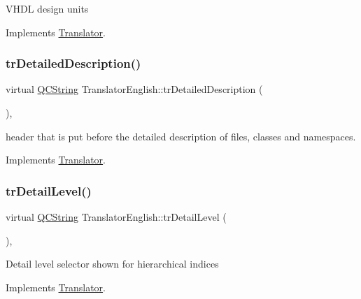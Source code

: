 V\+H\+DL design units 

Implements \mbox{\hyperlink{class_translator}{Translator}}.

\mbox{\label{class_translator_english_a8dd700811e7fe4caa458945578328044}} 
\subsubsection{\texorpdfstring{trDetailedDescription()}{trDetailedDescription()}}
{\footnotesize\ttfamily virtual \mbox{\hyperlink{class_q_c_string}{Q\+C\+String}} Translator\+English\+::tr\+Detailed\+Description (\begin{DoxyParamCaption}{ }\end{DoxyParamCaption})\hspace{0.3cm}{\ttfamily [inline]}, {\ttfamily [virtual]}}

header that is put before the detailed description of files, classes and namespaces. 

Implements \mbox{\hyperlink{class_translator}{Translator}}.

\mbox{\label{class_translator_english_a8cd72b866d1ee6133be6c081c9f1a006}} 
\subsubsection{\texorpdfstring{trDetailLevel()}{trDetailLevel()}}
{\footnotesize\ttfamily virtual \mbox{\hyperlink{class_q_c_string}{Q\+C\+String}} Translator\+English\+::tr\+Detail\+Level (\begin{DoxyParamCaption}{ }\end{DoxyParamCaption})\hspace{0.3cm}{\ttfamily [inline]}, {\ttfamily [virtual]}}

Detail level selector shown for hierarchical indices 

Implements \mbox{\hyperlink{class_translator}{Translator}}.

\mbox{\label{class_translator_english_adf2a2256c9e6d671e39410e09f352398}} 
